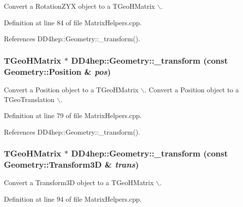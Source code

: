 Convert a RotationZYX object to a TGeoHMatrix $\backslash$. 

Definition at line 84 of file MatrixHelpers.cpp.

References DD4hep::Geometry::\_\-transform().\hypertarget{group___d_d4_h_e_p___g_e_o_m_e_t_r_y_ga543149f9fccc6961eb19ab307f96e192}{
\subsubsection[{\_\-transform}]{\setlength{\rightskip}{0pt plus 5cm}TGeoHMatrix $\ast$ DD4hep::Geometry::\_\-transform (const Geometry::Position \& {\em pos})}}
\label{group___d_d4_h_e_p___g_e_o_m_e_t_r_y_ga543149f9fccc6961eb19ab307f96e192}


Convert a Position object to a TGeoHMatrix $\backslash$. Convert a Position object to a TGeoTranslation $\backslash$. 

Definition at line 79 of file MatrixHelpers.cpp.

References DD4hep::Geometry::\_\-transform().\hypertarget{group___d_d4_h_e_p___g_e_o_m_e_t_r_y_ga01d65a905944a17404358ea0116d4dd3}{
\subsubsection[{\_\-transform}]{\setlength{\rightskip}{0pt plus 5cm}TGeoHMatrix $\ast$ DD4hep::Geometry::\_\-transform (const Geometry::Transform3D \& {\em trans})}}
\label{group___d_d4_h_e_p___g_e_o_m_e_t_r_y_ga01d65a905944a17404358ea0116d4dd3}


Convert a Transform3D object to a TGeoHMatrix $\backslash$. 

Definition at line 94 of file MatrixHelpers.cpp.

